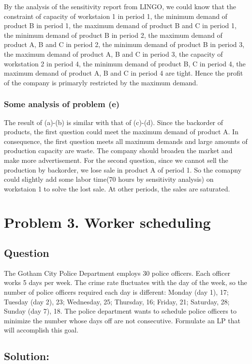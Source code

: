 \documentclass[12pt]{article}
\begin{document}
\noindent By the analysis of the sensitivity report from LINGO, we could know that the constraint of capacity of workstaion 1 in period 1, the minimum demand of product B in period 1, the maximum demand of product B and C in period 1, the minimum demand of product B in period 2, the maximum demand of product A, B and C in period 2, the minimum demand of product B in period 3, the maximum demand of product A, B and C in period 3, the capacity of workstation 2 in period 4,  the minimum demand of product B, C in period 4, the maximum demand of product A, B and C in period 4 are tight. Hence the profit of the company is primaryly restricted by the maximum demand.

\subsubsection{Some analysis of problem (e)}
The result of (a)-(b) is similar with that of (c)-(d). Since the backorder of products, the first question could meet the maximum demand of product A. In consequence, the first question meets all maximum demands and large amounts of production capacity are waste. The company should broaden the market and make more advertisement. For the second question, since we cannot sell the production by backorder, we lose sale in product A of period 1. So the comapny could slightly add some labor time(70 hours by sensitivity analysis) on workstaion 1 to solve the lost sale. At other periods, the sales are saturated.
\section{Problem 3. Worker scheduling }
	\subsection{Question}

	\noindent The Gotham City Police Department employs 30 police officers. Each officer works 5 days per week. The crime rate fluctuates with the day of the week, so the number of police officers required each day is different: Monday (day 1), 17; Tuesday (day 2), 23; Wednesday, 25; Thursday, 16; Friday, 21; Saturday, 28; Sunday (day 7), 18. The police department wants to schedule police officers to minimize the number whose days off are not consecutive. Formulate an LP that will accomplish this goal.
	\subsection{Solution:}
\end{document}
